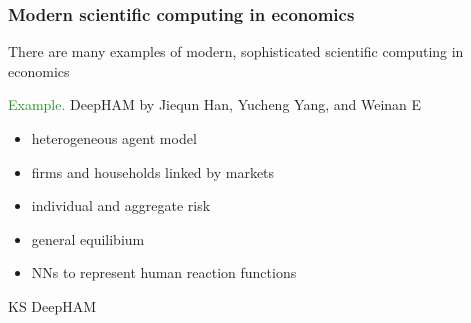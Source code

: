 \documentclass[
    xcolor={svgnames,dvipsnames},
    hyperref={colorlinks, citecolor=DeepPink4, linkcolor=DarkRed, urlcolor=DarkBlue}
    ]{beamer}  %
\newcommand{\Eg}{\textcolor{ForestGreen}{Example. }}
\newcommand{\1}{\mathbbm 1}
\begin{document}
\begin{frame}
    \frametitle{Modern scientific computing in economics}

    There are many examples of modern, sophisticated scientific computing in
    economics
            \vspace{0.3em}
            \vspace{0.3em}
            \vspace{0.3em}
    
    \Eg DeepHAM by Jiequn Han, Yucheng Yang, and Weinan E

    \begin{itemize}
        \item heterogeneous agent model
            \vspace{0.3em}
        \item firms and households linked by markets
            \vspace{0.3em}
        \item individual and aggregate risk
            \vspace{0.3em}
        \item general equilibium
            \vspace{0.3em}
        \item NNs to represent human reaction functions
    \end{itemize}

\end{frame}


\begin{frame}

    KS DeepHAM
    
    \begin{figure}
        \centering
    \end{figure}

\end{frame}
\end{document}
